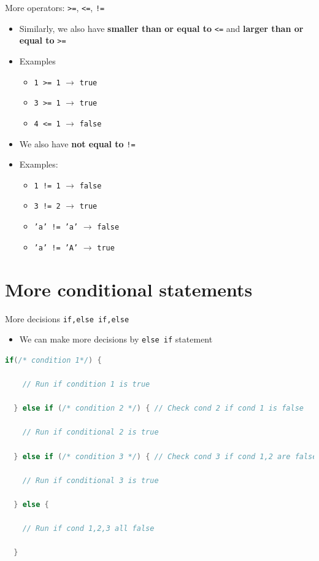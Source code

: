\documentclass[10pt,xcolor={table,dvipsnames},t]{beamer}
\begin{document}
\begin{frame}{More operators: \texttt{>=}, \texttt{<=}, \texttt{!=}}
  \begin{itemize}
    \item Similarly, we also have \textbf{smaller than or equal to} \texttt{<=} and \textbf{larger than or equal to} \texttt{>=}
    \item Examples
    \begin{itemize}
      \item \texttt{1 >= 1} $\rightarrow$ \texttt{true}
      \item \texttt{3 >= 1} $\rightarrow$ \texttt{true}
      \item \texttt{4 <= 1} $\rightarrow$ \texttt{false}
    \end{itemize}
    \item We also have \textbf{not equal to} \texttt{!=}
    \item  Examples:
    \begin{itemize}
      \item  \texttt{1 != 1} $\rightarrow$ \texttt{false}
      \item  \texttt{3 != 2} $\rightarrow$ \texttt{true}
      \item  \texttt{'a' != 'a'} $\rightarrow$ \texttt{false}
      \item  \texttt{'a' != 'A'} $\rightarrow$ \texttt{true}
    \end{itemize}
  \end{itemize}
\end{frame}

\section{More conditional statements}
\begin{frame}[fragile]{More decisions \texttt{if,else if,else}}
  \begin{itemize}
    \item We can make more decisions by \texttt{else if} statement
  \end{itemize}
\begin{lstlisting}[language=C]
  if(/* condition 1*/) {
    
    // Run if condition 1 is true

  } else if (/* condition 2 */) { // Check cond 2 if cond 1 is false

    // Run if conditional 2 is true

  } else if (/* condition 3 */) { // Check cond 3 if cond 1,2 are false

    // Run if conditional 3 is true 

  } else { 

    // Run if cond 1,2,3 all false

  }
\end{lstlisting}
\end{frame}
\end{document}

